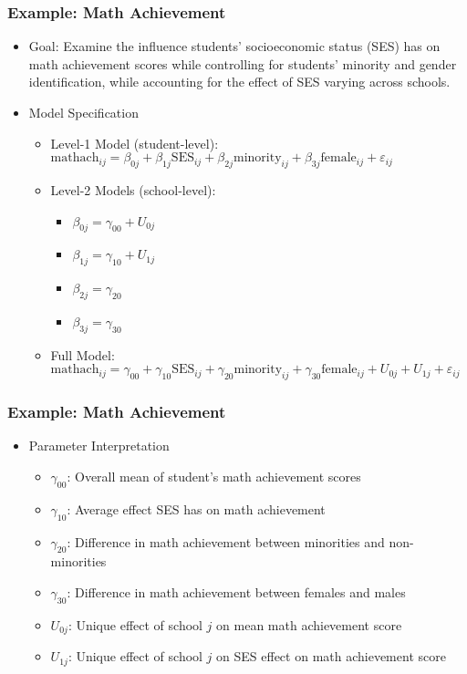 \documentclass{beamer}
\begin{document}
\begin{frame}
	\frametitle{Example: Math Achievement}
		\begin{itemize}
			\item Goal: Examine the influence students' socioeconomic status (SES) has on math achievement scores while controlling for students' minority and gender identification, while accounting for the effect of SES varying across schools.
			\item Model Specification
				\begin{itemize}
					\item Level-1 Model (student-level): $\mbox{mathach}_{ij}=\beta_{0j}+\beta_{1j}\mbox{SES}_{ij}+\beta_{2j}\mbox{minority}_{ij}+\beta_{3j}\mbox{female}_{ij}+\varepsilon_{ij}$
					\item Level-2 Models (school-level):
						\begin{itemize}
							\item $\beta_{0j}=\gamma_{00}+U_{0j}$
							\item $\beta_{1j}=\gamma_{10}+U_{1j}$
							\item $\beta_{2j}=\gamma_{20}$
							\item $\beta_{3j}=\gamma_{30}$
						\end{itemize}
					\item Full Model: $\mbox{mathach}_{ij}=\gamma_{00}+\gamma_{10}\mbox{SES}_{ij}+\gamma_{20}\mbox{minority}_{ij}+\gamma_{30}\mbox{female}_{ij}+U_{0j}+U_{1j}+\varepsilon_{ij}$
				\end{itemize}
		\end{itemize}
\end{frame}

\begin{frame}
	\frametitle{Example: Math Achievement}
		\begin{itemize}
			\item Parameter Interpretation
				\begin{itemize}
					\item $\gamma_{00}$: Overall mean of student's math achievement scores
					\item $\gamma_{10}$: Average effect SES has on math achievement
					\item $\gamma_{20}$: Difference in math achievement between minorities and non-minorities
					\item $\gamma_{30}$: Difference in math achievement between females and males
					\item $U_{0j}$: Unique effect of school $j$ on mean math achievement score
					\item $U_{1j}$: Unique effect of school $j$ on SES effect on math achievement score
				\end{itemize}
		\end{itemize}
\end{frame}
\end{document}
